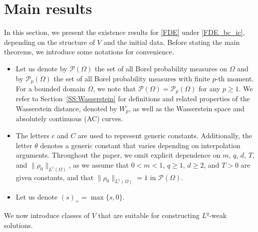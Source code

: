 \documentclass{amsart}
\numberwithin{equation}{section}
\begin{document}


\section{Main results}\label{S: Main}

In this section, we present the existence results for \eqref{FDE} under \eqref{FDE_bc_ic}, depending on the structure of \( V \) and the initial data. 
Before stating the main theorems, we introduce some notations for convenience.

\begin{itemize}
\item Let us denote by $\mathcal{P}(\Omega)$ the set of all Borel probability measures on $\Omega$ and by $\mathcal{P}_p(\Omega)$ the set of all Borel probability measures with finite $p$-th moment. For a bounded domain $\Omega$, we note that $\mathcal{P}(\Omega)= \mathcal{P}_p(\Omega)$ for any $p \geq 1$. We refer to Section~\ref{SS:Wasserstein} for definitions and related properties of the Wasserstein distance, denoted by \( W_p \), as well as the Wasserstein space and absolutely continuous (AC) curves.

\item The letters \( c \) and \( C \) are used to represent generic constants. Additionally, the letter \( \theta \) denotes a generic constant that varies depending on interpolation arguments.
    Throughout the paper, we omit explicit dependence on \( m \), \( q \), \( d \), \( T \), and 
    \( \|\rho_0\|_{L^{1}(\Omega)} \), as we assume that \( 0 < m < 1 \), \( q \geq 1 \), \( d \geq 2 \), and \( T > 0 \) are given constants, and that \( \|\rho_0\|_{L^{1}(\Omega)} = 1 \) in \( \mathcal{P}(\Omega) \).

\item Let us denote $(s)_{+} = \max\{ s, 0\}$.

\end{itemize}



We now introduce classes of $V$ that are suitable for constructing $L^q$-weak solutions.  
  
\end{document}
